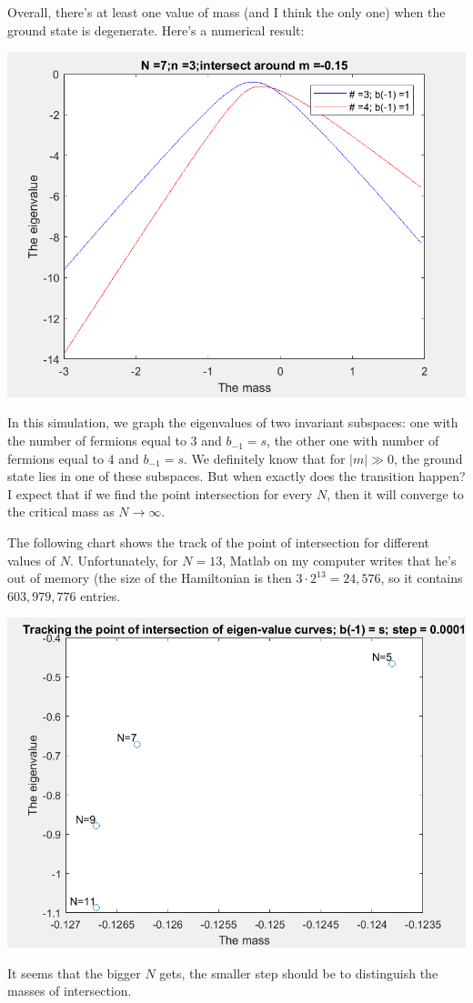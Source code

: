 Overall, there's at least one value of mass (and I think the only one) when the ground state is degenerate. Here's a numerical result:
\begin{center}
\includegraphics[scale=0.8]{subspinters.jpg}
\end{center}
In this simulation, we graph the eigenvalues of two invariant subspaces: one with the number of fermions equal to $3$ and $b_{-1} = s$, the other one with number of fermions equal to $4$ and $b_{-1} =s $. We definitely know that for $|m| \gg 0$, the ground state lies in one of these subspaces. But when exactly does the transition happen? I expect that if we find the point intersection for every $N$, then it will converge to the critical mass as $N \rightarrow \infty$.

The following chart shows the track of the point of intersection for different values of $N$. Unfortunately, for $N=13$, Matlab on my computer writes that he's out of memory (the size of the Hamiltonian is then $3\cdot 2^{13}  = 24,576$, so it contains $603,979,776$ entries.

\begin{center}
\includegraphics[scale=0.8]{track.jpg}
\end{center}
It seems that the bigger $N$ gets, the smaller step should be to distinguish the masses of intersection.

